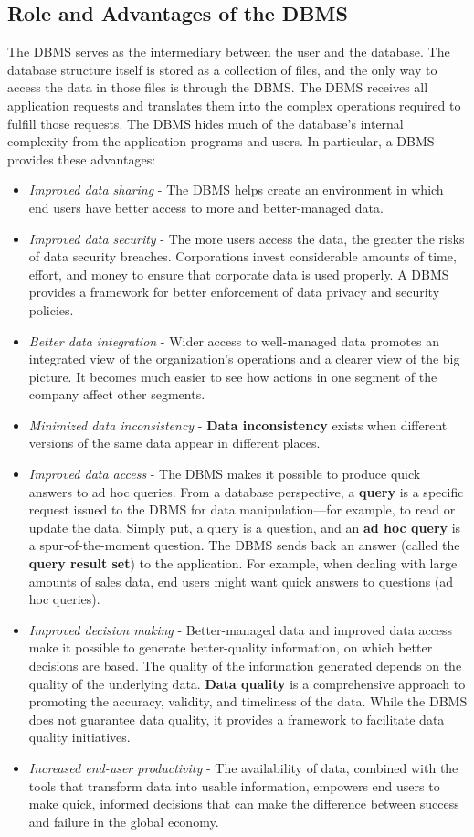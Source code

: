 \documentclass[a4paper, 12pt, titlepage]{report}
\begin{document}
\subsection{Role and Advantages of the DBMS}
The DBMS serves as the intermediary between the user and the database. The database structure itself is stored as a collection of files, and the only way to access the data in those files is through the DBMS. The DBMS receives all application requests and translates them into the complex operations required to fulfill those requests. The DBMS hides much of the database’s internal complexity from the application programs and users.
\noindent In particular, a DBMS provides these advantages:
\begin{itemize}
\item \emph{Improved data sharing} - The DBMS helps create an environment in which end users have better access to more and better-managed data.
\item \emph{Improved data security} - The more users access the data, the greater the risks of data security breaches. Corporations invest considerable amounts of time, effort, and money to ensure that corporate data is used properly. A DBMS provides a framework for better enforcement of data privacy and security policies.
\item \emph{Better data integration} - Wider access to well-managed data promotes an integrated view of the organization’s operations and a clearer view of the big picture. It becomes much easier to see how actions in one segment of the company affect other segments.
\item \emph{Minimized data inconsistency} - \textbf{Data inconsistency} exists when different versions of the same data appear in different places.
\item \emph{Improved data access} - The DBMS makes it possible to produce quick answers to ad hoc queries. From a database perspective, a \textbf{query} is a specific request issued to the DBMS for data manipulation—for example, to read or update the data. Simply put, a query is a question, and an \textbf{ad hoc query} is a spur-of-the-moment question. The
DBMS sends back an answer (called the \textbf{query result set}) to the application. For example, when dealing with large amounts of sales data, end users might want quick answers to questions (ad hoc queries).
\item \emph{Improved decision making} - Better-managed data and improved data access make it possible to generate better-quality information, on which better decisions are based. The quality of the information generated depends on the quality of the underlying data. \textbf{Data quality} is a comprehensive approach to promoting the accuracy, validity, and timeliness of the data. While the DBMS does not guarantee data quality, it provides a framework to facilitate data quality initiatives.
\item \emph{Increased end-user productivity} - The availability of data, combined with the tools that transform data into usable information, empowers end users to make quick, informed decisions that can make the difference between success and failure in the global economy.
\end{itemize}
\end{document}

